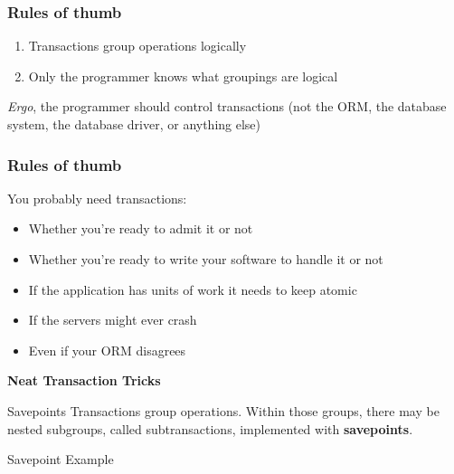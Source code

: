 \documentclass[svgnames]{beamer}
\begin{document}
\begin{frame}
    \frametitle{Rules of thumb}
    \begin{enumerate}
        \item Transactions group operations logically
        \item Only the programmer knows what groupings are logical
    \end{enumerate}
\textit{Ergo}, the programmer should control transactions (not the ORM, the database system, the database driver, or anything else)
\end{frame}

\begin{frame}
    \frametitle{Rules of thumb}
    You probably need transactions:
    \begin{itemize}
        \item Whether you're ready to admit it or not
        \item Whether you're ready to write your software to handle it or not
        \item If the application has units of work it needs to keep atomic
        \item If the servers might ever crash
        \item Even if your ORM disagrees
    \end{itemize}
\end{frame}

\begin{frame}
    \begin{centering}
        \textbf{Neat Transaction Tricks}
        \par
    \end{centering}
\end{frame}

\begin{frame}{Savepoints}
    Transactions group operations. Within those groups, there may be nested
    subgroups, called subtransactions, implemented with \textbf{savepoints}.
\end{frame}

\begin{frame}{Savepoint Example}
\end{frame}
\end{document}
